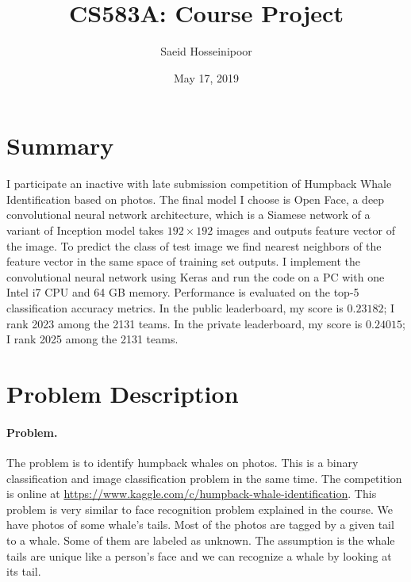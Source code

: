 \documentclass[11pt]{article}
\numberwithin{equation}{section}
\begin{document}
\title{CS583A: Course Project}

\author{Saeid Hosseinipoor}

\date{May 17, 2019 }

\maketitle




\section{Summary}

I participate an inactive with late submission competition of Humpback Whale Identification based on photos. 
The final model I choose is Open Face, a deep convolutional neural network architecture, which is a Siamese network of a variant of Inception model takes $192\times 192$ images and outputs feature vector of the image. To predict the class of test image we find nearest neighbors of the feature vector in the same space of training set outputs.
I implement the convolutional neural network using Keras and run the code on a PC with one Intel i7 CPU and 64 GB memory.
Performance is evaluated on the top-5 classification accuracy metrics.
In the public leaderboard, my score is $0.23182$; I rank 2023 among the 2131 teams. In the private leaderboard, my score is $0.24015$; I rank 2025 among the 2131 teams.



\section{Problem Description}



\paragraph{Problem.}
The problem is to identify humpback whales on photos.
This is a binary classification and image classification problem in the same time.
The competition is online at \url{https://www.kaggle.com/c/humpback-whale-identification}.
This problem is very similar to face recognition problem explained in the course. We have photos of some whale's tails. Most of the photos are tagged by a given tail to a whale. Some of them are labeled as unknown. The assumption is the whale tails are unique like a person's face and we can recognize a whale by looking at its tail. 
\end{document}

